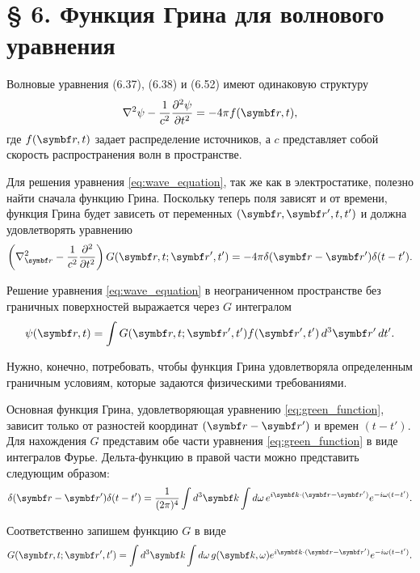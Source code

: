 \documentclass[%
biblatex,
]{ConspectBook}
\begin{document}
\section*{§ 6. Функция Грина для волнового уравнения}

Волновые уравнения (6.37), (6.38) и (6.52) имеют одинаковую структуру
\begin{equation}
\label{eq:wave_equation}
\nabla^2 \psi - \frac{1}{c^2} \frac{\partial^2 \psi}{\partial t^2} = -4\pi f(\vect{r}, t),
\end{equation}
где \( f(\vect{r}, t) \) задает распределение источников, а \( c \) представляет собой скорость распространения волн в пространстве.

Для решения уравнения \eqref{eq:wave_equation}, так же как в электростатике, полезно найти сначала функцию Грина. Поскольку теперь поля зависят и от
времени, функция Грина будет зависеть от переменных \((\vect{r}, \vect{r}', t, t')\) и должна удовлетворять уравнению
\begin{equation}
\label{eq:green_function}
\left( \nabla_{\vect{r}}^2 - \frac{1}{c^2} \frac{\partial^2}{\partial t^2} \right) G(\vect{r}, t; \vect{r}', t') = -4\pi \delta (\vect{r} -
\vect{r}') \delta (t - t').
\end{equation}

Решение уравнения \eqref{eq:wave_equation} в неограниченном пространстве без граничных поверхностей выражается через \( G \) интегралом
\begin{equation}
\label{eq:solution}
\psi(\vect{r}, t) = \int G(\vect{r}, t; \vect{r}', t') f(\vect{r}', t') \, d^3 \vect{r}' \, dt'.
\end{equation}

Нужно, конечно, потребовать, чтобы функция Грина удовлетворяла определенным граничным условиям, которые задаются физическими требованиями.

Основная функция Грина, удовлетворяющая уравнению \eqref{eq:green_function}, зависит только от разностей координат \((\vect{r} - \vect{r}')\)
и времен \((t - t')\). Для нахождения \( G \) представим обе части уравнения \eqref{eq:green_function} в виде интегралов Фурье. Дельта-функцию в правой
части можно представить следующим образом:
\begin{equation}
\label{eq:delta_fourier}
\delta (\vect{r} - \vect{r}') \delta (t - t') = \frac{1}{(2\pi)^4} \int d^3 \vect{k} \int d\omega \, e^{i \vect{k} \cdot (\vect{r} -
\vect{r}')} e^{-i \omega (t - t')}.
\end{equation}

Соответственно запишем функцию \( G \) в виде
\begin{equation}
\label{eq:green_fourier}
G(\vect{r}, t; \vect{r}', t') = \int d^3 \vect{k} \int d\omega \, g(\vect{k}, \omega) e^{i \vect{k} \cdot (\vect{r} - \vect{r}')} e^{-i
\omega (t - t')}.
\end{equation}
\end{document}
